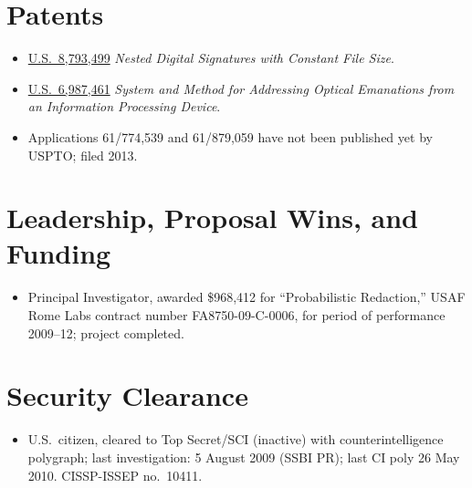 \documentclass[12pt,twoside,letterpaper]{article}
\begin{document}
\vspace{-9mm}
\section*{Patents}
\vspace{-2mm}
\begin{itemize}
	\item \href{http://google.com/patents/US8793499}{U.S.\ 8,793,499}
		\emph{Nested Digital Signatures with Constant File Size}.
	\vspace{-1mm}
    \item \href{http://www.google.com/patents/US6987461}{U.S.\ 6,987,461}
		\emph{System and Method for Addressing Optical Emanations from an
		Information Processing Device}.
	\vspace{-1mm}
	\item Applications 61/774,539 and 61/879,059 have not been published
		yet by USPTO; filed 2013.
\end{itemize}

\vspace{-8mm}
\section*{Leadership, Proposal Wins, and Funding}
\vspace{-2mm}
\begin{itemize}
	\item Principal Investigator, awarded \$968,412 for ``Probabilistic Redaction,''
	USAF Rome Labs contract number FA8750-09-C-0006, for period of performance 2009--12;
	project completed.
\end{itemize}

\vspace{-8mm}
\section*{Security Clearance}
\vspace{-2mm}
\begin{itemize}
	\item U.S.\ citizen, cleared to Top Secret/SCI (inactive) with counterintelligence
		polygraph; last investigation: 5 August 2009 (SSBI PR); last CI poly 26 May 2010.
		CISSP-ISSEP no.\ 10411.
\end{itemize}

\setlength{\fboxsep}{0pt}

\vspace{-8mm}
\end{document}

